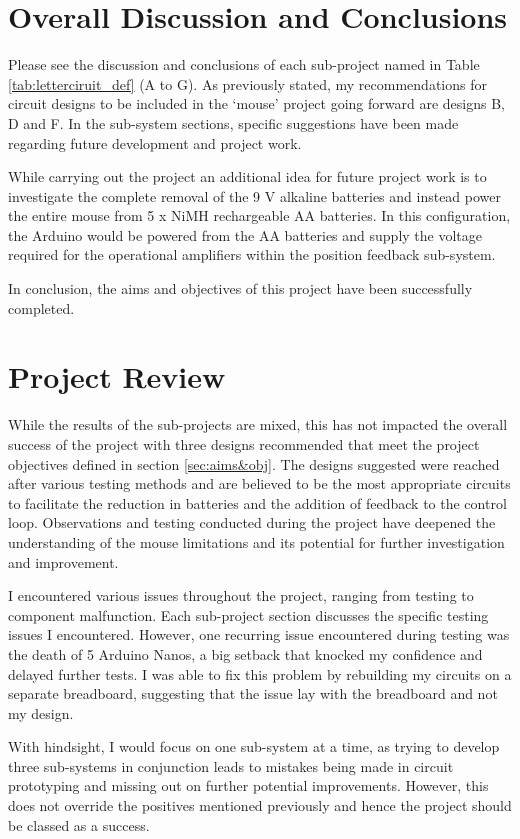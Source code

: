 \chapter{Overall Discussion and Conclusions}
Please see the discussion and conclusions of each sub-project named in Table \ref{tab:letterciruit_def} (A to G). As previously stated, my recommendations for circuit designs to be included in the `mouse' project going forward are designs B, D and F. In the sub-system sections, specific suggestions have been made regarding future development and project work.

While carrying out the project an additional idea for future project work is to investigate the complete removal of the 9 V alkaline batteries and instead power the entire mouse from 5 x NiMH rechargeable AA batteries. In this configuration, the Arduino would be powered from the AA batteries and supply the voltage required for the operational amplifiers within the position feedback sub-system. 

In conclusion, the aims and objectives of this project have been successfully completed.

{\let\clearpage\relax\chapter{Project Review}}
While the results of the sub-projects are mixed, this has not impacted the overall success of the project with three designs recommended that meet the project objectives defined in section \ref{sec:aims&obj}. The designs suggested were reached after various testing methods and are believed to be the most appropriate circuits to facilitate the reduction in batteries and the addition of feedback to the control loop. Observations and testing conducted during the project have deepened the understanding of the mouse limitations and its potential for further investigation and improvement.

I encountered various issues throughout the project, ranging from testing to component malfunction. Each sub-project section discusses the specific testing issues I encountered. However, one recurring issue encountered during testing was the death of 5 Arduino Nanos, a big setback that knocked my confidence and delayed further tests. I was able to fix this problem by rebuilding my circuits on a separate breadboard, suggesting that the issue lay with the breadboard and not my design.

With hindsight, I would focus on one sub-system at a time, as trying to develop three sub-systems in conjunction leads to mistakes being made in circuit prototyping and missing out on further potential improvements. However, this does not override the positives mentioned previously and hence the project should be classed as a success. 

